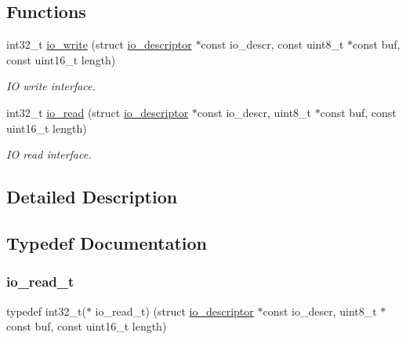 \subsection*{Functions}
\begin{DoxyCompactItemize}
\item 
int32\+\_\+t \hyperlink{group__doc__driver__hal__helper__io_ga81aac60d5ce6feb0c44f8937d7c02f14}{io\+\_\+write} (struct \hyperlink{structio__descriptor}{io\+\_\+descriptor} $\ast$const io\+\_\+descr, const uint8\+\_\+t $\ast$const buf, const uint16\+\_\+t length)
\begin{DoxyCompactList}\small\item\em IO write interface. \end{DoxyCompactList}\item 
int32\+\_\+t \hyperlink{group__doc__driver__hal__helper__io_gaf5e8722129933fa8e014144fd7505be6}{io\+\_\+read} (struct \hyperlink{structio__descriptor}{io\+\_\+descriptor} $\ast$const io\+\_\+descr, uint8\+\_\+t $\ast$const buf, const uint16\+\_\+t length)
\begin{DoxyCompactList}\small\item\em IO read interface. \end{DoxyCompactList}\end{DoxyCompactItemize}


\subsection{Detailed Description}


\subsection{Typedef Documentation}
\mbox{\label{group__doc__driver__hal__helper__io_ga4d9ae58de2887289fe09eac6f0aa8be7}} 
\subsubsection{\texorpdfstring{io\+\_\+read\+\_\+t}{io\_read\_t}}
{\footnotesize\ttfamily typedef int32\+\_\+t($\ast$ io\+\_\+read\+\_\+t) (struct \hyperlink{structio__descriptor}{io\+\_\+descriptor} $\ast$const io\+\_\+descr, uint8\+\_\+t $\ast$const buf, const uint16\+\_\+t length)}



